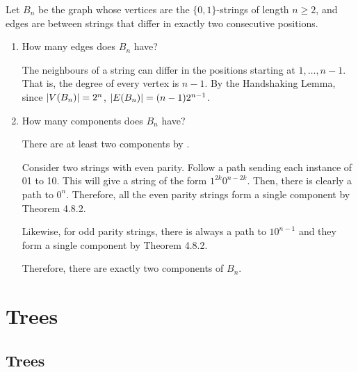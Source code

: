\documentclass[class=math239,notes,tikz]{agony}
\begin{document}
\begin{xca}
  Let $B_n$ be the graph whose vertices are the $\{0,1\}$-strings of length $n \geq 2$,
  and edges are between strings that differ in exactly two consecutive positions.
\end{xca}
\begin{enumerate}
  \item How many edges does $B_n$ have?
        \begin{sol}
          The neighbours of a string can differ in the positions starting at $1,\dotsc,n-1$.
          That is, the degree of every vertex is $n-1$.
          By the Handshaking Lemma, since $\abs{V(B_n)} = 2^n$,
          $\abs{E(B_n)} = (n-1)2^{n-1}$. 
        \end{sol}
  \item How many components does $B_n$ have?
        \begin{sol}
          There are at least two components by .

          Consider two strings with even parity.
          Follow a path sending each instance of 01 to 10.
          This will give a string of the form $1^{2k}0^{n-2k}$.
          Then, there is clearly a path to $0^n$.
          Therefore, all the even parity strings form a single component by Theorem 4.8.2.

          Likewise, for odd parity strings, there is always a path to $10^{n-1}$
          and they form a single component by Theorem 4.8.2.

          Therefore, there are exactly two components of $B_n$.
        \end{sol}
\end{enumerate}

\section{Trees}

\subsection{Trees}
\end{document}
